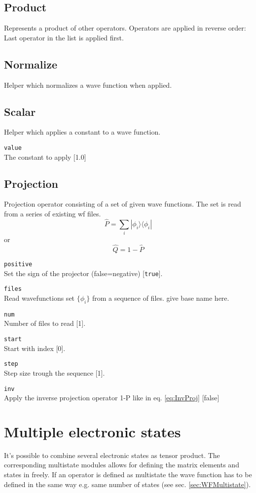 \documentclass[a4paper,12pt]{scrbook}
\newcommand{\option}[2]{\item \texttt{#1}\\ #2}
\newcommand{\code}[1]{\texttt{#1}}
\begin{document}
\subsection{Product}
Represents a product of other operators.
Operators are applied in reverse order: Last operator in the list is applied first.

\subsection{Normalize}
Helper which normalizes a wave function when applied.

\subsection{Scalar}
Helper which applies a constant to a wave function.
\begin{options}
 \option{value}{The constant to apply [1.0]}
\end{options}

\subsection{Projection}
Projection operator consisting of a set of given wave functions. The set is read from
a series of existing wf files.
\begin{equation}
 \hat P = \sum_i |\phi_i\rangle \langle \phi_i|
\end{equation}
or
\begin{equation}
 \label{eq:InvProj}
 \hat Q = 1 - \hat P
\end{equation}
\begin{options}
\option{positive}{Set the sign of the projector (false=negative) [\code{true}].}
\option{files}{Read wavefunctions set $\{\phi_i\}$ from a sequence of files. give base name here.}
\option{num}{Number of files to read [1].}
\option{start}{Start with index [0].}
\option{step}{Step size trough the sequence [1].}
\option{inv}{Apply the inverse projection operator 1-P like in eq. \ref{eq:InvProj} [false]}
\end{options}

\section{Multiple electronic states}
It's possible to combine several electronic states as tensor product. The corresponding multistate
modules allows for defining the matrix elements and states in freely.
If an operator is defined as multistate the wave function has to be defined in the same way e.g. same
number of states (see sec. \ref{sec:WFMultistate}).
\end{document}
